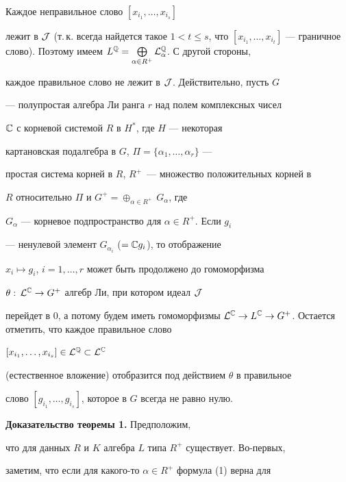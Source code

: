 \begin{pf}


Каждое неправильное слово $[x_{i_1},\dotsc,x_{i_s}]$


лежит в $\cal J$ (т.\,к. всегда найдется такое $1<t\le s$, что $[x_{i_1},


\dotsc,x_{i_t}]$ --- граничное слово). Поэтому имеем $L^{\Bbb Q}=


\bigoplus\limits_{\alpha\in R^+}\cal L_\alpha^{\Bbb Q}$. С другой стороны,


каждое правильное слово не лежит в $\cal J$. Действительно, пусть $G$


--- полупростая алгебра Ли ранга $r$ над полем комплексных чисел


$\Bbb C$ с корневой системой $R$ в $H^*$, где $H$ --- некоторая


картановская подалгебра в $G$, $\Pi=\{\alpha_1,\dotsc,\alpha_r\}$ ---


простая система корней в $R$, $R^+$~--- множество положительных корней в


$R$ относительно $\Pi$ и $G^+=\oplus_{\alpha\in R^+}\,G_\alpha$, где


$G_\alpha$ --- корневое подпространство для $\alpha\in R^+$. Если $g_i$


--- ненулевой элемент $G_{\alpha_i}$ ($={\Bbb C}g_i$), то отображение


$x_i\mapsto g_i$, $i=1,\dotsc,r$ может быть продолжено до гомоморфизма


$\theta:\,{\cal L}^{\Bbb C}\to G^+$ алгебр Ли, при котором идеал $\cal J$


перейдет в $0$, а потому будем иметь гомоморфизмы ${\cal L}^{\Bbb C}


\to L^{\Bbb C}\to G^+$. Остается отметить, что каждое правильное слово


$[x_{i_1},\dotsc,x_{i_s}]\in{\cal L}^{\Bbb Q}\subset{\cal L}^{\Bbb C}$


(естественное вложение) отобразится под действием $\theta$ в правильное


слово $[g_{i_1},\dotsc,g_{i_s}]$, которое в $G$ всегда не равно нулю.


\end{pf}





{\bf Доказательство теоремы 1.} Предположим,


что для данных $R$ и $K$ алгебра $L$ типа $R^+$ существует. Во-первых,


заметим, что если для какого-то $\alpha\in R^+$ формула (1) верна для


